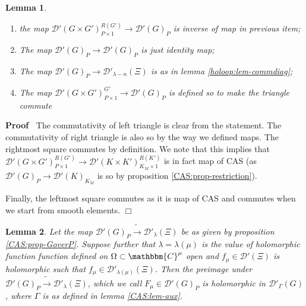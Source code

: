 \documentclass{article}
\newcommand{\nobracket}{}
\newenvironment{proof}{\noindent\textbf{Proof\ }}{\hspace*{\fill}$\Box$\medskip}
\newtheorem{lemma}{Lemma}
\begin{document}
\begin{lemma}
\begin{enumerate}
    \item the map $\mathcal{D}' (G \nobracket \times G' \nobracket)^{R
    (G')}_{P \times 1} \rightarrow \mathcal{D}' (G)_P$ is inverse of map in
    previous item;
    
    \item The map $\mathcal{D}' (G)_P \rightarrow \mathcal{D}' (G)_P$ is just
    identity map;
    
    \item The map $\mathcal{D}' (G)_P \rightarrow \mathcal{D}'_{\lambda - n}
    (\Xi)$ is as in lemma \ref{holoop:lem-commdiag};
    
    \item The map $\mathcal{D}' (G \times G')_{P \times 1}^{G'} \rightarrow
    \mathcal{D}' (G)_P$ is defined so to make the triangle commute
  \end{enumerate}
\end{lemma}

\begin{proof}
  The commutativity of left triangle is clear from the statement. The
  commutativity of right triangle is also so by the way we defined maps. The
  rightmost square commutes by definition. We note that this implies that
  $\mathcal{D}' (G \times G')_{P \times 1}^{R (G')} \rightarrow \mathcal{D}'
  (K \times K')^{R (K')}_{K_M \times 1}$ is in fact map of CAS (as
  $\mathcal{D}'  (G)_P \rightarrow \mathcal{D}' (K)_{K_M}$ is so by
  proposition \ref{CAS:prop-restriction}).
  
  Finally, the leftmost square commutes as it is map of CAS and commutes when
  we start from smooth elements.
\end{proof}

\begin{lemma}
  \label{holoop:lem-main-aux}Let the map $\mathcal{D}' (G)_P
  \tilde{\rightarrow} \mathcal{D}'_{\lambda} (\Xi)$ be as given by proposition
  \ref{CAS:prop-GoverP}. Suppose further that $\lambda = \lambda (\mu)$ is the
  value of holomorphic function function defined on $\Omega \subset
  \mathbbm{C}^{\mu}$ open and $f_{\mu} \in \mathcal{D}' (\Xi)$ is holomorphic
  such that $f_{\mu} \in \mathcal{D}'_{\lambda (\mu)} (\Xi)$. Then the
  preimage under $\mathcal{D}' (G)_P \tilde{\rightarrow}
  \mathcal{D}'_{\lambda} (\Xi)$, which we call $F_{\mu} \in \mathcal{D}'
  (G)_P$ is holomorphic in $\mathcal{D}'_{\Gamma} (G)$, where $\Gamma$ is as
  defined in lemma \ref{CAS:lem-aux}.
\end{lemma}
\end{document}
